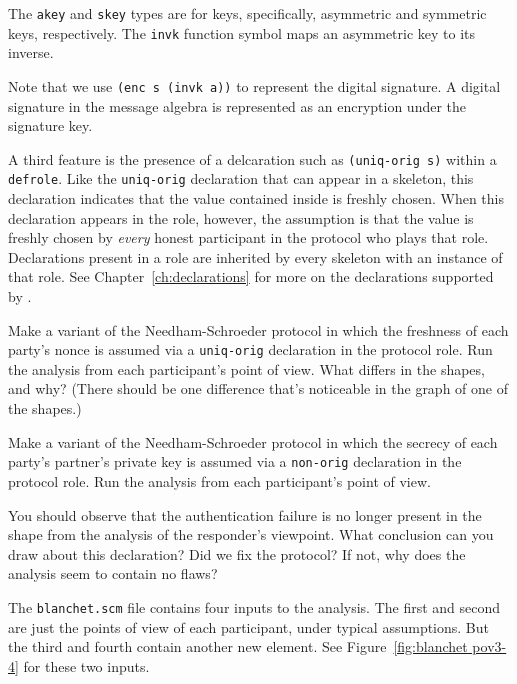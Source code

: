 The \texttt{akey} and \texttt{skey} types are for keys, specifically,
asymmetric and symmetric keys, respectively.  The \texttt{invk}
function symbol maps an asymmetric key to its inverse.

 Note that we use \texttt{(enc s (invk a))} to
represent the digital signature.  A digital signature in the {\cpsa}
message algebra is represented as an encryption under the signature
key.

 A third feature is the presence of a
delcaration such as \texttt{(uniq-orig s)} within a
\texttt{defrole}.  Like the \texttt{uniq-orig} declaration that can
appear in a skeleton, this declaration indicates that the value
contained inside is freshly chosen.  When this declaration appears in
the role, however, the assumption is that the value is freshly chosen
by \emph{every} honest participant in the protocol who plays that
role.  Declarations present in a role are inherited by every skeleton
with an instance of that role.  See Chapter~\ref{ch:declarations} for
more on the declarations supported by \cpsa.

\begin{exercise}
Make a variant of the Needham-Schroeder protocol in which the
freshness of each party's nonce is assumed via a \texttt{uniq-orig}
declaration in the protocol role.  Run the analysis from each
participant's point of view.  What differs in the shapes, and why?
(There should be one difference that's noticeable in the graph of one
of the shapes.)
\end{exercise}

\begin{exercise}
Make a variant of the Needham-Schroeder protocol in which the secrecy
of each party's partner's private key is assumed via a
\texttt{non-orig} declaration in the protocol role.  Run the analysis
from each participant's point of view.

You should observe that the authentication failure is no longer
present in the shape from the analysis of the responder's viewpoint.
What conclusion can you draw about this declaration?  Did we fix the
protocol?  If not, why does the analysis seem to contain no flaws?
\end{exercise}

The \texttt{blanchet.scm} file contains four inputs to the analysis.
The first and second are just the points of view of each participant,
under typical assumptions.  But the third and fourth contain another
new element.  See Figure~\ref{fig:blanchet pov3-4} for these two
inputs.

